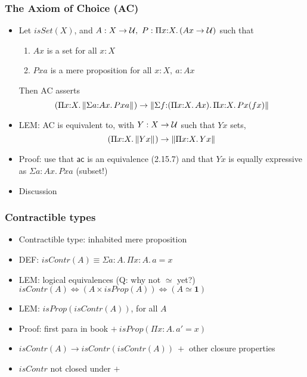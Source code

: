 \documentclass[handout]{beamer}
\newcommand{\depi}[3]{\Pi{#1{:}#2.\,#3}}
\newcommand{\sigm}[3]{\Sigma{#1{:}#2.\,#3}}
\newcommand{\UU}{{\cal U}}
\newcommand{\bfone}{\mathbf{1}}
\begin{document}
\frame
  {
  
    \frametitle{The Axiom of Choice (AC)}

    \begin{itemize}[<+->]
    \item Let $isSet(X)$, and $A:X\to\UU,~P:\depi{x}{X}{(Ax\to\UU)}$ such that
      \begin{enumerate}[<+->]   
      \item $Ax$ is a set for all $x:X$
      \item $Pxa$ is a mere proposition for all $x:X,~a:Ax$
      \end{enumerate}    
     Then AC asserts
\[(\depi{x}{X}{\brck{\sigm{a}{Ax}{Pxa}}})\to\brck{\sigm{f}{(\depi{x}{X}{Ax})}{\depi{x}{X}{Px(fx)}}}\]
    \item LEM: AC is equivalent to, with $Y:X\to\UU$ such that $Yx$ sets,
\[(\depi{x}{X}{\brck{Yx}})\to\brck{\depi{x}{X}{Yx}}\]
    \item Proof: use that $\mathsf{ac}$ is an equivalence (2.15.7) and that $Yx$
          is equally expressive as $\sigm{a}{Ax}{Pxa}$ (subset!)
    \item Discussion
    \end{itemize}
  }

\frame
  {
  
    \frametitle{Contractible types}

    \begin{itemize}[<+->]
    \item Contractible type: inhabited mere proposition
    \item DEF: $isContr(A) \equiv \sigm{a}{A}{\depi{x}{A}{a=x}}$
    \item LEM: logical equivalences (Q: why not $\simeq$ yet?)
          $isContr(A) \iff (A\times isProp(A)) \iff (A\simeq\bfone)$
    \item LEM: $isProp(isContr(A))$, for all $A$
    \item Proof: first para in book $+~isProp(\depi{x}{A}{a'=x})$
    \item $isContr(A)\to isContr(isContr(A))~+$ other closure properties
    \item $isContr$ not closed under $+$
    \end{itemize}
  }
\end{document}
